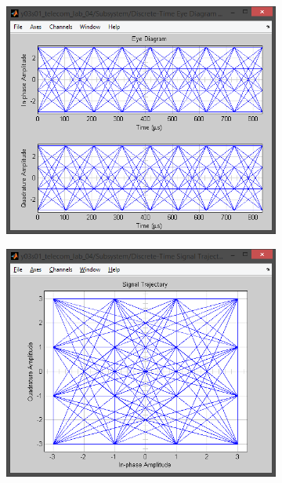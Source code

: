 \documentclass[
	a4paper,
	oneside,
	BCOR = 10mm,
	DIV = 12,
	12pt,
	headings = normal,
]{scrartcl}
\begin{document}
				\begin{figure}[!htbp]
					\centering
					\begin{subfigure}{\textwidth / 3}
						\centering
						\includegraphics[height = 7\baselineskip]{../01-solution/rolloff-1p0-eye-diag-in.png}
						\caption{}
						\label{subfig:rolloff-1p0-eye-in}
					\end{subfigure}%
					\begin{subfigure}{\textwidth / 3}
						\centering
						\includegraphics[height = 7\baselineskip]{../01-solution/rolloff-1p0-signal-trajectory-in.png}

\end{subfigure}
\end{figure}
\end{document}
